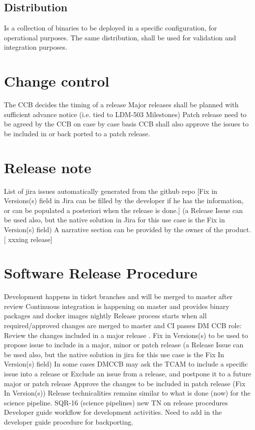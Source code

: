 \subsection{Distribution} \label{sect:distribution}
Is a collection of binaries to be deployed in a specific configuration, for operational purposes.
The same distribution, shall be used for validation and integration purposes.

\newpage
\section{Change control} \label{sect:cangecontrol}
The CCB decides the timing of a release 
Major releases shall be planned with sufficient advance notice (i.e. tied to LDM-503 Milestones)
Patch release need to be agreed by the CCB on case by case basis
CCB shall also approve the issues to be included in or back ported to a patch release.

\newpage
\section{Release note} \label{sect:relnote}
List of jira issues automatically generated from the github repo [Fix in Versions(s) field in Jira can be filled by the developer if he has the information, or can be populated a posteriori when the release is done.] 
(a Release Issue can be used also, but the native solution in Jira for this use case is the Fix in Version(s) field)
A narrative section can be provided by the owner of the product. [ xxxing release]

\newpage
\section{Software Release Procedure} \label{sect:releaseprocedure}
Development happens in ticket branches and will be merged to master after review
Continuous integration is happening on master and provides binary packages and docker images nightly
Release process starts when all required/approved changes are merged to master and CI passes
DM CCB role: 
Review the changes included in a major release . 
Fix in Versions(s) to be used to propose issue to include in a major, minor or patch release (a Release Issue can be used also, but the native solution in jira for this use case is the Fix In Version(s) field)
In some cases DMCCB may ask the TCAM to include a specific issue into a release or
Exclude an issue from a release, and postpone it to a future major or patch release
Approve the changes to be included in patch release (Fix In Version(s))
Release technicalities remains similar to what is done (now) for the science pipeline.
SQR-16 (science pipelines) new TN on release procedures
Developer guide workflow for development activities.
Need to add in the developer guide procedure for backporting.
